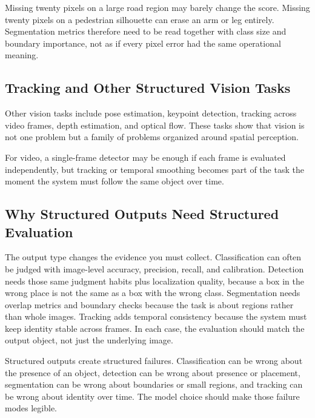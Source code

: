 \begin{example}
Missing twenty pixels on a large road region may barely change the score. Missing twenty pixels on a pedestrian silhouette can erase an arm or leg entirely. Segmentation metrics therefore need to be read together with class size and boundary importance, not as if every pixel error had the same operational meaning.
\end{example}

\subsection{Tracking and Other Structured Vision Tasks}

Other vision tasks include pose estimation, keypoint detection, tracking across video frames, depth estimation, and optical flow. These tasks show that vision is not one problem but a family of problems organized around spatial perception.

For video, a single-frame detector may be enough if each frame is evaluated independently, but tracking or temporal smoothing becomes part of the task the moment the system must follow the same object over time.

\subsection{Why Structured Outputs Need Structured Evaluation}

The output type changes the evidence you must collect. Classification can often be judged with image-level accuracy, precision, recall, and calibration. Detection needs those same judgment habits plus localization quality, because a box in the wrong place is not the same as a box with the wrong class. Segmentation needs overlap metrics and boundary checks because the task is about regions rather than whole images. Tracking adds temporal consistency because the system must keep identity stable across frames. In each case, the evaluation should match the output object, not just the underlying image.

\begin{practicalnote}
Structured outputs create structured failures. Classification can be wrong about the presence of an object, detection can be wrong about presence or placement, segmentation can be wrong about boundaries or small regions, and tracking can be wrong about identity over time. The model choice should make those failure modes legible.
\end{practicalnote}

